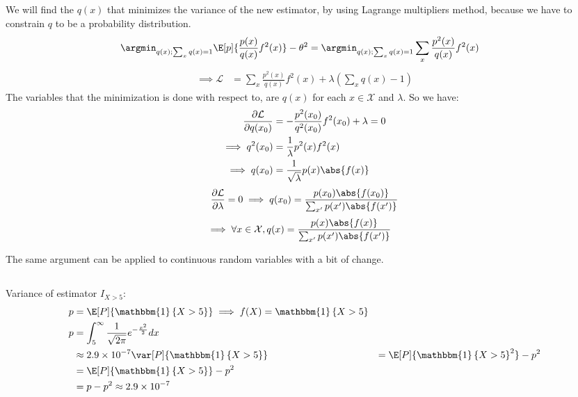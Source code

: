 \documentclass{article}
\begin{document}
\subsection{}
We will find the \(q(x)\) that minimizes the variance of the new estimator, by using Lagrange multipliers method, because we have to constrain \(q\) to be a probability distribution.
\begin{align*}
\argmin_{q(x); \sum_{x}q(x)=1} \E[p]{\frac{p(x)}{q(x)}f^2(x)} - \theta^2
&= \argmin_{q(x); \sum_{x}q(x)=1} \sum_{x} \frac{p^2(x)}{q(x)} f^2(x)
\end{align*}
\begin{align*}
\implies \mathcal{L} &= \sum_{x} \frac{p^2(x)}{q(x)} f^2(x) + \lambda \left(\sum_{x}q(x) - 1\right)
\end{align*}
The variables that the minimization is done with respect to, are \(q(x)\) for each \(x \in \mathcal{X}\) and \(\lambda\). So we have:
\begin{align*}
\frac{\partial \mathcal{L}}{\partial q(x_0)} &= -\frac{p^2(x_0)}{q^2(x_0)} f^2(x_0) + \lambda = 0\\
\implies q^2(x_0) &= \frac{1}{\lambda} p^2(x)f^2(x)\\
\implies q(x_0) &= \frac{1}{\sqrt{\lambda}} p(x)\abs{f(x)}
\end{align*}
\begin{align*}
\frac{\partial \mathcal{L}}{\partial \lambda} = 0 \implies q(x_0) = \frac{p(x_0)\abs{f(x_0)}}{\sum_{x'} p(x')\abs{f(x')}}
\end{align*}
\begin{align*}
\implies \forall x \in \mathcal{X}, q(x) &= \frac{p(x)\abs{f(x)}}{\sum_{x'} p(x')\abs{f(x')}}
\end{align*}

The same argument can be applied to continuous random variables with a bit of change.

\subsection{}
Variance of estimator \(I_{X > 5}\):
\begin{align*}
p &= \E[P]{\mathbbm{1}\left\{X > 5\right\}} \implies f(X) = \mathbbm{1}\left\{X > 5\right\}\\
p &= \int_{5}^{\infty} \frac{1}{\sqrt{2\pi}} e^{-\frac{x^2}{2}} dx\\
&\approx 2.9 \times 10^{-7}
\var[P]{\mathbbm{1}\left\{X > 5\right\}} &= \E[P]{\mathbbm{1}\left\{X > 5\right\}^2} - p^2\\
&= \E[P]{\mathbbm{1}\left\{X > 5\right\}} - p^2\\
&= p - p^2 \approx 2.9 \times 10^{-7}
\end{align*}
\end{document}
